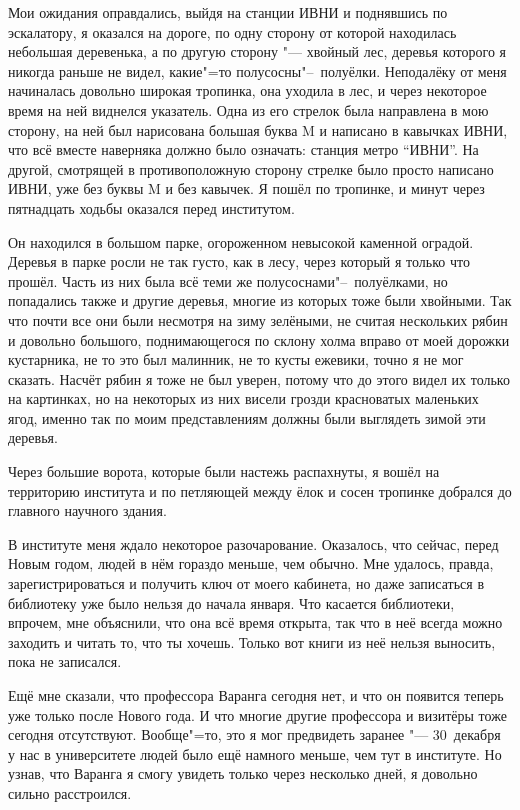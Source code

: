 Мои ожидания оправдались, выйдя на станции ИВНИ и поднявшись по эскалатору, я
оказался на дороге, по одну сторону от которой находилась небольшая деревенька,
а по другую сторону "--- хвойный лес, деревья которого я никогда раньше не
видел, какие"=то полусосны"--~полуёлки.
Неподалёку от меня начиналась довольно широкая тропинка, она уходила в лес, и
через некоторое время на ней виднелся указатель.
Одна из его стрелок была направлена в мою сторону, на ней был нарисована большая
буква M и написано в кавычках ИВНИ, что всё вместе наверняка должно было
означать: станция метро \enquote{ИВНИ}.
На другой, смотрящей в противоположную сторону стрелке было просто написано
ИВНИ, уже без буквы M и без кавычек.
Я пошёл по тропинке, и минут через пятнадцать ходьбы оказался перед институтом.

Он находился в большом парке, огороженном невысокой каменной оградой.
Деревья в парке росли не так густо, как в лесу, через который я только что
прошёл.
Часть из них была всё теми же полусоснами"--~полуёлками, но попадались также и
другие деревья, многие из которых тоже были хвойными.
Так что почти все они были несмотря на зиму зелёными, не считая нескольких рябин
и довольно большого, поднимающегося по склону холма вправо от моей дорожки
кустарника, не то это был малинник, не то кусты ежевики, точно я не мог сказать.
Насчёт рябин я тоже не был уверен, потому что до этого видел их только на
картинках, но на некоторых из них висели грозди красноватых маленьких ягод,
именно так по моим представлениям должны были выглядеть зимой эти деревья.

Через большие ворота, которые были настежь распахнуты, я вошёл на территорию
института и по петляющей между ёлок и сосен тропинке добрался до главного
научного здания.

В институте меня ждало некоторое разочарование.
Оказалось, что сейчас, перед Новым годом, людей в нём гораздо меньше, чем
обычно.
Мне удалось, правда, зарегистрироваться и получить ключ от моего кабинета, но
даже записаться в библиотеку уже было нельзя до начала января.
Что касается библиотеки, впрочем, мне объяснили, что она всё время открыта, так
что в неё всегда можно заходить и читать то, что ты хочешь.
Только вот книги из неё нельзя выносить, пока не записался.

Ещё мне сказали, что профессора Варанга сегодня нет, и что он появится теперь
уже только после Нового года.
И что многие другие профессора и визитёры тоже сегодня отсутствуют.
Вообще"=то, это я мог предвидеть заранее "--- 30~декабря у нас в университете
людей было ещё намного меньше, чем тут в институте.
Но узнав, что Варанга я смогу увидеть только через несколько дней, я довольно
сильно расстроился.

